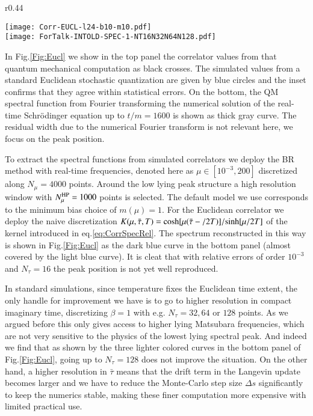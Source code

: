 \documentclass[epj]{webofc}
\begin{document}
\begin{wrapfigure}{r}{0.44\textwidth}
  \begin{center}\vspace{-0.3cm}
\texttt{[image: Corr-EUCL-l24-b10-m10.pdf]}\\
\texttt{[image: ForTalk-INTOLD-SPEC-1-NT16N32N64N128.pdf]}
  \end{center}\vspace{-0.5cm}
 \caption{(top) Comparison of the QM correlator (black cross) to its standard Euclidean simulation (blue circle). (bottom) Reconstructed spectra from Euclidean data via the BR method (colored solid).}\label{Fig:Eucl}\vspace{-0.7cm}
\end{wrapfigure}In Fig.\ref{Fig:Eucl} we show in the top panel the correlator values from that quantum mechanical computation as black crosses. The simulated values from a standard Euclidean stochastic quantization are given by blue circles and the inset confirms that they agree within statistical errors. On the bottom, the QM spectral function from Fourier transforming the numerical solution of the real-time Schr\"odinger equation up to $t/m=1600$ is shown as thick gray curve. The residual width due to the numerical Fourier transform is not relevant here, we focus on the peak position. 

To extract the spectral functions from simulated correlators we deploy the BR method \cite{Burnier:2013nla} with real-time frequencies, denoted here as $\mu\in[10^{-3},200]$ discretized along $N_\mu=4000$ points. Around the low lying peak structure a high resolution window with $N_\mu^{\rm  HP}=1000$ points is selected. The default model we use corresponds to the minimum bias choice of $m(\mu)=1$. For the Euclidean correlator we deploy the naive discretization $K(\mu,\bar\tau,T)={\rm cosh}[\mu(\bar\tau-/2T)]/{\rm  sinh}[\mu/2T]$ of the kernel introduced in eq.\eqref{eq:CorrSpecRel}. The spectrum reconstructed in this way is shown in Fig.\ref{Fig:Eucl} as the dark blue curve in the bottom panel (almost covered by the light blue curve). It is cleat that with relative errors of order $10^{-3}$ and $N_\tau=16$ the peak position is not yet well reproduced. 

In standard simulations, since temperature fixes the Euclidean time extent, the only handle for improvement we have is to go to higher resolution in compact imaginary time, discretizing $\beta=1$ with e.g. $N_\tau=32,64$ or $128$ points. As we argued before this only gives access to higher lying Matsubara frequencies, which are not very sensitive to the physics of the lowest lying spectral peak. And indeed we find that as shown by the three lighter colored curves in the bottom panel of Fig.\ref{Fig:Eucl}, going up to $N_\tau=128$ does not improve the situation. On the other hand, a higher resolution in $\bar{\tau}$ means that the drift term in the Langevin update becomes larger and we have to reduce the Monte-Carlo step size $\Delta s$ significantly to keep the numerics stable, making these finer computation more expensive with limited practical use. 
\end{document}
